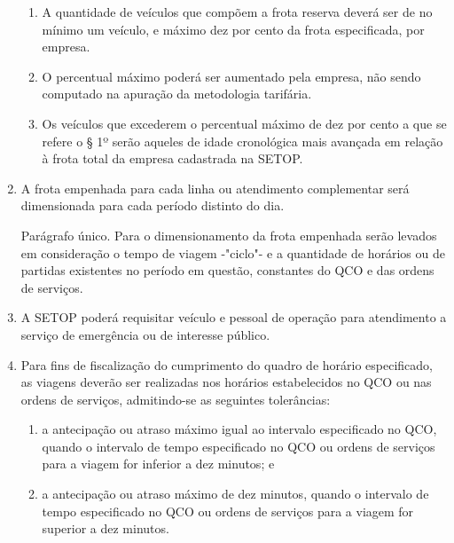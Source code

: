 \begin{enumerate}[resume, label=Art. \arabic*]
\begin{enumerate}[label= \S \arabic*] %

\item A quantidade de veículos que compõem a frota reserva deverá ser de no mínimo um veículo, e máximo dez por cento da frota especificada, por empresa.

\item O percentual máximo poderá ser aumentado pela empresa, não sendo computado na apuração da metodologia tarifária.

\item Os veículos que excederem o percentual máximo de dez por cento a que se refere o § 1º serão aqueles de idade cronológica mais avançada em relação à frota total da empresa cadastrada na SETOP.

\end{enumerate}

\item A frota empenhada para cada linha ou atendimento complementar será dimensionada para cada período distinto do dia.

Parágrafo único. Para o dimensionamento da frota empenhada serão levados em consideração o tempo de viagem -"ciclo"- e a quantidade de horários ou de partidas existentes no período em questão, constantes do QCO e das ordens de serviços.

\item A SETOP poderá requisitar veículo e pessoal de operação para atendimento a serviço de emergência ou de interesse público.


\item Para fins de fiscalização do cumprimento do quadro de horário especificado, as viagens deverão ser realizadas nos horários estabelecidos no QCO ou nas ordens de serviços, admitindo-se as seguintes tolerâncias:

\begin{enumerate}[label=\roman*.]

\item a antecipação ou atraso máximo igual ao intervalo especificado no QCO, quando o intervalo de tempo especificado no QCO ou ordens de serviços para a viagem for inferior a dez minutos; e

\item a antecipação ou atraso máximo de dez minutos, quando o intervalo de tempo especificado no QCO ou ordens de serviços para a viagem for superior a dez minutos.

\end{enumerate}


\end{enumerate}
